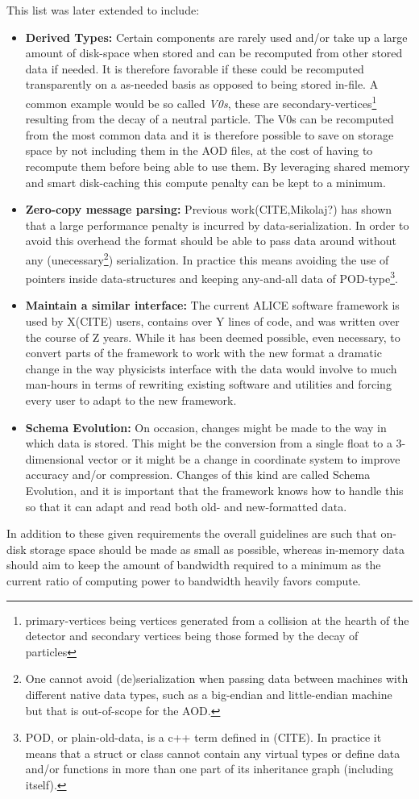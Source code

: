 \documentclass[a4paper]{report}
\begin{document}
This list was later extended to include:
\begin{itemize}
  \item {\bf Derived Types:} Certain components are rarely used and/or take up a large amount of disk-space when stored and can be recomputed from other stored data if needed.
  It is therefore favorable if these could be recomputed transparently on a as-needed basis as opposed to being stored in-file. A common example would be so called {\em V0s}, these are secondary-vertices\footnote{primary-vertices
  being vertices generated from a collision at the hearth of the detector and secondary vertices being those formed by the decay of particles} resulting from the decay of a neutral particle. The V0s can be recomputed from the most common data
  and it is therefore possible to save on storage space by not including them in the AOD files, at the cost of having to recompute them before being able to use them. By leveraging shared memory and smart disk-caching
  this compute penalty can be kept to a minimum.
  \item {\bf Zero-copy message parsing:} Previous work(CITE,Mikolaj?) has shown that a large performance penalty is incurred by data-serialization. In order to avoid this overhead the
  format should be able to pass data around without any
  (unecessary\footnote{One cannot avoid (de)serialization when passing data between machines with different native data types, such as a big-endian
   and little-endian machine but that is out-of-scope for the AOD.}) serialization.
   In practice this means avoiding the use of pointers inside data-structures and keeping any-and-all data of POD-type\footnote{POD, or plain-old-data, is a c++ term defined in (CITE). In practice it means that a struct or class cannot contain any virtual types
   or define data and/or functions in more than one part of its inheritance graph (including itself).}.
  \item {\bf Maintain a similar interface:} The  current ALICE software framework is used by X(CITE) users, contains over Y lines of code, and was written over the course of
  Z years. While it has been deemed possible, even necessary, to convert parts of the framework to work with the new format a dramatic change in the way physicists interface
  with the data would involve to much man-hours in terms of rewriting existing software and utilities and forcing every user to adapt to the new framework.
  \item {\bf Schema Evolution:} On occasion, changes might be made to the way in which data is stored. This might be the conversion from a single float to a 3-dimensional vector or it might
  be a change in coordinate system to improve accuracy and/or compression. Changes of this kind are called Schema Evolution, and it is important that the framework knows how to handle this so
  that it can adapt and read both old- and new-formatted data.
\end{itemize}
In addition to these given requirements the overall guidelines are such that on-disk storage space should be made as small as possible, whereas in-memory data should aim to keep the amount of bandwidth required to a minimum
as the current ratio of computing power to bandwidth heavily favors compute.
\end{document}
